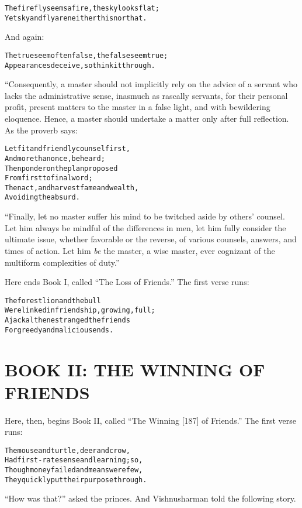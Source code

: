 \documentclass{article}
\renewenvironment{verbatim}{\begin{alltt}\normalfont\begin{centering}}{\end{centering}\end{alltt}}
\begin{document}
\begin{verbatim}
The firefly seems a fire, the sky looks flat;
Yet sky and fly are neither this nor that.
\end{verbatim}
And again:

\begin{verbatim}
The true seem often false, the false seem true;
Appearances deceive, so think it through.
\end{verbatim}
“Consequently, a master should not implicitly rely on the advice of
a servant who lacks the administrative sense, inasmuch as rascally
servants, for their personal profit, present matters to the master
in a false light, and with bewildering eloquence. Hence, a master
should undertake a matter only after full reflection. As the
proverb says:

\begin{verbatim}
Let fit and friendly counsel first,
    And more than once, be heard;
Then ponder on the plan proposed
    From first to final word;
Then act, and harvest fame and wealth,
    Avoiding the absurd.
\end{verbatim}
``Finally, let no master suffer his mind to be twitched aside by others' counsel. Let him always be mindful of the differences in men, let him fully consider the ultimate issue, whether favorable or the reverse, of various counsels, answers, and times of action. Let him \emph{be} the master, a wise master, ever cognizant of the multiform complexities of duty.''

Here ends Book I, called ``The Loss of Friends.'' The first verse
runs:

\begin{verbatim}
The forest lion and the bull
Were linked in friendship, growing, full;
A jackal then estranged the friends
For greedy and malicious ends.                          
\end{verbatim}
\section{BOOK II: THE WINNING OF FRIENDS}

Here, then, begins Book II, called
``The Winning [187] of Friends.'' The first verse runs:

\begin{verbatim}
The mouse and turtle, deer and crow,
Had first-rate sense and learning; so,
Though money failed and means were few,
They quickly put their purpose through.
\end{verbatim}
``How was that?'' asked the princes. And Vishnusharman told the
following story.
\end{document}
